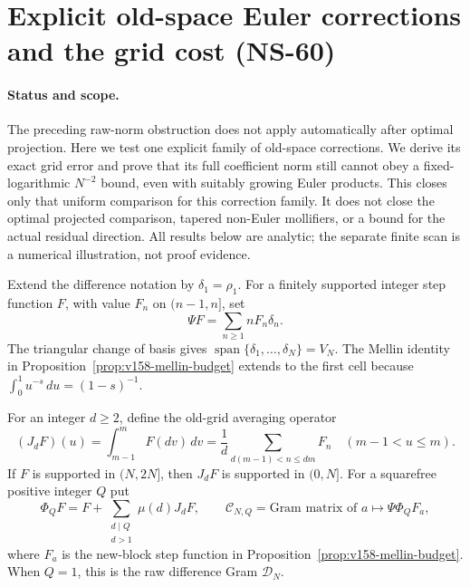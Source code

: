 \section{Explicit old-space Euler corrections and the grid cost (NS-60)}
\label{sec:ns60-euler-corrections}

\paragraph{Status and scope.}
The preceding raw-norm obstruction does not apply automatically after
optimal projection. Here we test one explicit family of old-space
corrections. We derive its exact grid error and prove that its full
coefficient norm still cannot obey a fixed-logarithmic $N^{-2}$ bound,
even with suitably growing Euler products. This closes only that uniform
comparison for this correction family. It does not close the optimal
projected comparison, tapered non-Euler mollifiers, or a bound for the
actual residual direction. All results below are analytic; the separate
finite scan is a numerical illustration, not proof evidence.

Extend the difference notation by $\delta_1=\rho_1$. For a finitely
supported integer step function $F$, with value $F_n$ on $(n-1,n]$, set
\begin{equation}
 \Psi F=\sum_{n\geq1}nF_n\delta_n.
 \label{eq:ns60-step-map}
\end{equation}
The triangular change of basis gives
$\operatorname{span}\{\delta_1,\ldots,\delta_N\}=V_N$.
The Mellin identity in Proposition~\ref{prop:v158-mellin-budget} extends
to the first cell because $\int_0^1u^{-s}\,du=(1-s)^{-1}$.

For an integer $d\geq2$, define the old-grid averaging operator
\begin{equation}
 (J_dF)(u)=\int_{m-1}^{m}F(dv)\,dv
 =\frac1d\sum_{d(m-1)<n\leq dm}F_n
 \quad(m-1<u\leq m).
 \label{eq:ns60-cell-average}
\end{equation}
If $F$ is supported in $(N,2N]$, then $J_dF$ is supported in $(0,N]$.
For a squarefree positive integer $Q$ put
\begin{equation}
 \Phi_QF=F+\sum_{\substack{d\mid Q\\d>1}}\mu(d)J_dF,
 \qquad
 \mathcal C_{N,Q}=\text{Gram matrix of }a\longmapsto\Psi\Phi_QF_a,
 \label{eq:ns60-euler-correction}
\end{equation}
where $F_a$ is the new-block step function in
Proposition~\ref{prop:v158-mellin-budget}. When $Q=1$, this is the raw
difference Gram $\mathcal D_N$.

